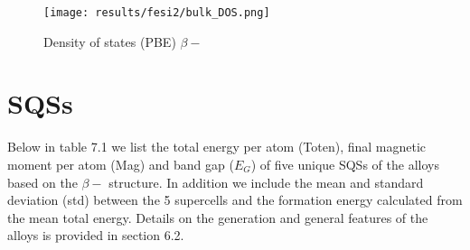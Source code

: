 \begin{figure}[H]
\centering
\texttt{[image: results/fesi2/bulk\_DOS.png]}
\caption{Density of states (PBE) $\beta-$ }
\end{figure}
 

\section{ SQSs}
Below in table 7.1 we list the total energy per atom (Toten), final magnetic moment per atom (Mag) and band gap ($E_G$) of five unique SQSs of the  alloys based on the $\beta-$  structure. In addition we include the mean and standard deviation (std) between the 5 supercells and the formation energy calculated from the mean total energy. Details on the generation and general features of the alloys is provided in section 6.2. 
 
